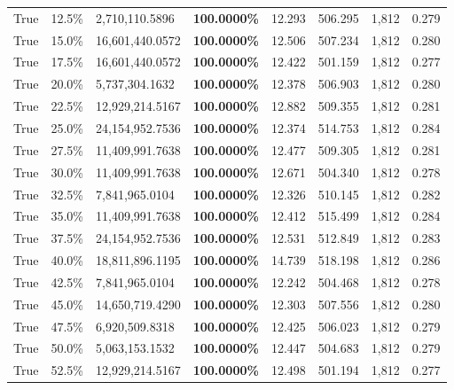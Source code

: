 \begin{table}[H]
\begin{tabular}{lllrllll}
\cline{1-8}
True & 12.5\% & 2,710,110.5896 & \bfseries \color{red} 100.0000\% & 12.293 & 506.295 & 1,812 & 0.279 \\
\cline{1-8}
True & 15.0\% & 16,601,440.0572 & \bfseries \color{red} 100.0000\% & 12.506 & 507.234 & 1,812 & 0.280 \\
\cline{1-8}
True & 17.5\% & 16,601,440.0572 & \bfseries \color{red} 100.0000\% & 12.422 & 501.159 & 1,812 & 0.277 \\
\cline{1-8}
True & 20.0\% & 5,737,304.1632 & \bfseries \color{red} 100.0000\% & 12.378 & 506.903 & 1,812 & 0.280 \\
\cline{1-8}
True & 22.5\% & 12,929,214.5167 & \bfseries \color{red} 100.0000\% & 12.882 & 509.355 & 1,812 & 0.281 \\
\cline{1-8}
True & 25.0\% & 24,154,952.7536 & \bfseries \color{red} 100.0000\% & 12.374 & 514.753 & 1,812 & 0.284 \\
\cline{1-8}
True & 27.5\% & 11,409,991.7638 & \bfseries \color{red} 100.0000\% & 12.477 & 509.305 & 1,812 & 0.281 \\
\cline{1-8}
True & 30.0\% & 11,409,991.7638 & \bfseries \color{red} 100.0000\% & 12.671 & 504.340 & 1,812 & 0.278 \\
\cline{1-8}
True & 32.5\% & 7,841,965.0104 & \bfseries \color{red} 100.0000\% & 12.326 & 510.145 & 1,812 & 0.282 \\
\cline{1-8}
True & 35.0\% & 11,409,991.7638 & \bfseries \color{red} 100.0000\% & 12.412 & 515.499 & 1,812 & 0.284 \\
\cline{1-8}
True & 37.5\% & 24,154,952.7536 & \bfseries \color{red} 100.0000\% & 12.531 & 512.849 & 1,812 & 0.283 \\
\cline{1-8}
True & 40.0\% & 18,811,896.1195 & \bfseries \color{red} 100.0000\% & 14.739 & 518.198 & 1,812 & 0.286 \\
\cline{1-8}
True & 42.5\% & 7,841,965.0104 & \bfseries \color{red} 100.0000\% & 12.242 & 504.468 & 1,812 & 0.278 \\
\cline{1-8}
True & 45.0\% & 14,650,719.4290 & \bfseries \color{red} 100.0000\% & 12.303 & 507.556 & 1,812 & 0.280 \\
\cline{1-8}
True & 47.5\% & 6,920,509.8318 & \bfseries \color{red} 100.0000\% & 12.425 & 506.023 & 1,812 & 0.279 \\
\cline{1-8}
True & 50.0\% & 5,063,153.1532 & \bfseries \color{red} 100.0000\% & 12.447 & 504.683 & 1,812 & 0.279 \\
\cline{1-8}
True & 52.5\% & 12,929,214.5167 & \bfseries \color{red} 100.0000\% & 12.498 & 501.194 & 1,812 & 0.277 \\

\end{tabular}
\end{table}
